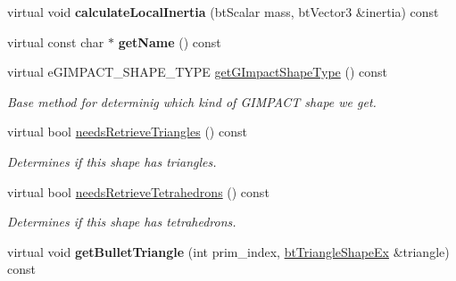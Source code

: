 \begin{DoxyCompactItemize}
\item 
\mbox{\label{classbtGImpactMeshShapePart_a3e59b1c8aac3a65f0265b1e743f9c4df}} 
virtual void {\bfseries calculate\+Local\+Inertia} (bt\+Scalar mass, bt\+Vector3 \&inertia) const
\item 
\mbox{\label{classbtGImpactMeshShapePart_a4da86f769fd3701c5d40092b0dccc926}} 
virtual const char $\ast$ {\bfseries get\+Name} () const
\item 
virtual e\+G\+I\+M\+P\+A\+C\+T\+\_\+\+S\+H\+A\+P\+E\+\_\+\+T\+Y\+PE \hyperlink{classbtGImpactMeshShapePart_a89fb18e93d2f4078576b6789e59891a2}{get\+G\+Impact\+Shape\+Type} () const
\begin{DoxyCompactList}\small\item\em Base method for determinig which kind of G\+I\+M\+P\+A\+CT shape we get. \end{DoxyCompactList}\item 
\mbox{\label{classbtGImpactMeshShapePart_a82ebf9e731222b2fee8d5c44cd8a0d28}} 
virtual bool \hyperlink{classbtGImpactMeshShapePart_a82ebf9e731222b2fee8d5c44cd8a0d28}{needs\+Retrieve\+Triangles} () const
\begin{DoxyCompactList}\small\item\em Determines if this shape has triangles. \end{DoxyCompactList}\item 
\mbox{\label{classbtGImpactMeshShapePart_ab800ef8c218a4776b264a918728a2ea0}} 
virtual bool \hyperlink{classbtGImpactMeshShapePart_ab800ef8c218a4776b264a918728a2ea0}{needs\+Retrieve\+Tetrahedrons} () const
\begin{DoxyCompactList}\small\item\em Determines if this shape has tetrahedrons. \end{DoxyCompactList}\item 
\mbox{\label{classbtGImpactMeshShapePart_a4a46ebb0cd93bdc7b7d300ab839f84a1}} 
virtual void {\bfseries get\+Bullet\+Triangle} (int prim\+\_\+index, \hyperlink{classbtTriangleShapeEx}{bt\+Triangle\+Shape\+Ex} \&triangle) const
\item 
\mbox{\label{classbtGImpactMeshShapePart_adf717b6d42fc9071da5404fdd45ec2c4}} 

\end{DoxyCompactItemize}
